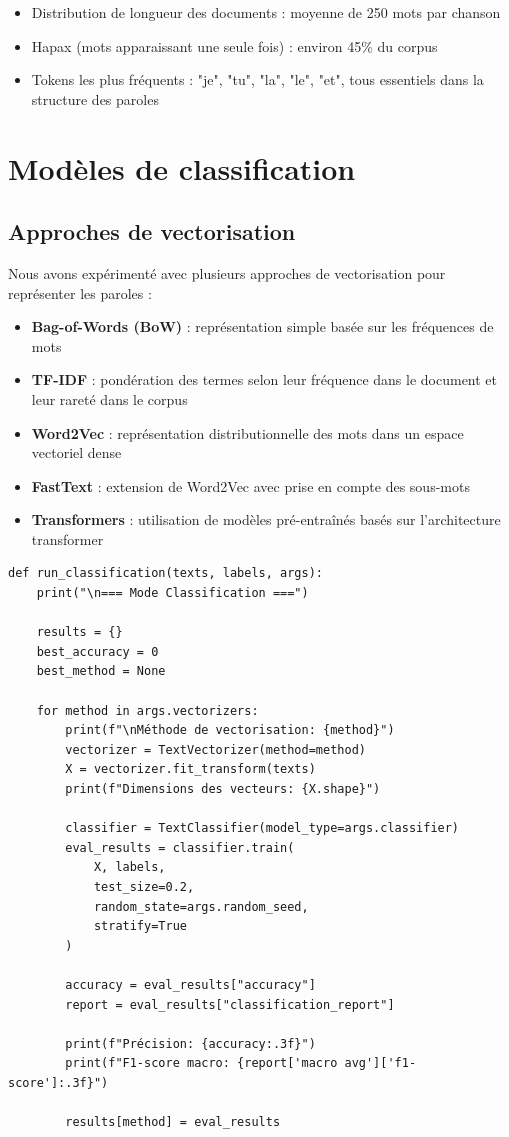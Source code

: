\documentclass[a4paper,11pt]{article}
\begin{document}
\begin{itemize}
    \item Distribution de longueur des documents : moyenne de 250 mots par chanson
    \item Hapax (mots apparaissant une seule fois) : environ 45\% du corpus
    \item Tokens les plus fréquents : "je", "tu", "la", "le", "et", tous essentiels dans la structure des paroles
\end{itemize}

\section{Modèles de classification}
\label{sec:classification}

\subsection{Approches de vectorisation}
Nous avons expérimenté avec plusieurs approches de vectorisation pour représenter les paroles :

\begin{itemize}
    \item \textbf{Bag-of-Words (BoW)} : représentation simple basée sur les fréquences de mots
    \item \textbf{TF-IDF} : pondération des termes selon leur fréquence dans le document et leur rareté dans le corpus
    \item \textbf{Word2Vec} : représentation distributionnelle des mots dans un espace vectoriel dense
    \item \textbf{FastText} : extension de Word2Vec avec prise en compte des sous-mots
    \item \textbf{Transformers} : utilisation de modèles pré-entraînés basés sur l'architecture transformer
\end{itemize}

\begin{lstlisting}[caption=Extrait du code de classification]
def run_classification(texts, labels, args):
    print("\n=== Mode Classification ===")
    
    results = {}
    best_accuracy = 0
    best_method = None
    
    for method in args.vectorizers:
        print(f"\nMéthode de vectorisation: {method}")
        vectorizer = TextVectorizer(method=method)
        X = vectorizer.fit_transform(texts)
        print(f"Dimensions des vecteurs: {X.shape}")
        
        classifier = TextClassifier(model_type=args.classifier)
        eval_results = classifier.train(
            X, labels, 
            test_size=0.2, 
            random_state=args.random_seed, 
            stratify=True
        )
        
        accuracy = eval_results["accuracy"]
        report = eval_results["classification_report"]
        
        print(f"Précision: {accuracy:.3f}")
        print(f"F1-score macro: {report['macro avg']['f1-score']:.3f}")
        
        results[method] = eval_results
\end{lstlisting}
\end{document}
